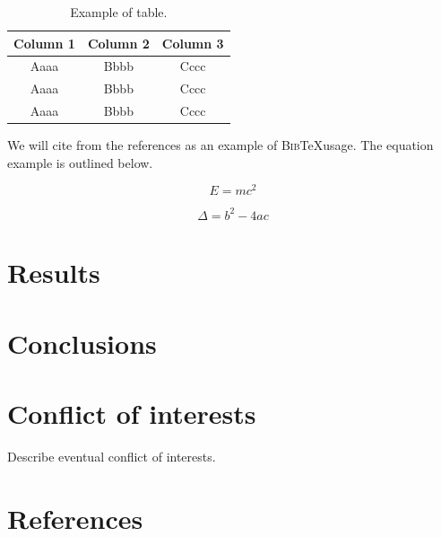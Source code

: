 \documentclass[12pt, english, brazilian]{bjedis}
\begin{document}
\begin{table}[htpb]
    \centering
    \caption{Example of table.}
    \begin{tabular}{c c c}
    \toprule
    \textbf{Column 1} & \textbf{Column 2} & \textbf{Column 3} \\
    \midrule
    Aaaa & Bbbb & Cccc \\
    Aaaa & Bbbb & Cccc \\
    Aaaa & Bbbb & Cccc \\
    \bottomrule
    \end{tabular}
    \label{tab:example}
\end{table}

\lipsum[9]

We will cite \cite{lamport1994latex} from the references as an example of \textsc{Bib}\TeX usage. The equation example is outlined below.

\begin{equation}
    E = m c^2
    \label{eq:example1}
\end{equation}

\begin{equation}
    \Delta = b^2 - 4 a c
    \label{eq:example2}
\end{equation}

\section{Results}
\lipsum[10-11]

\section{Conclusions}
\lipsum[12-13]

\section{Conflict of interests}
Describe eventual conflict of interests.

\postextual


\section{References}


\end{document}
